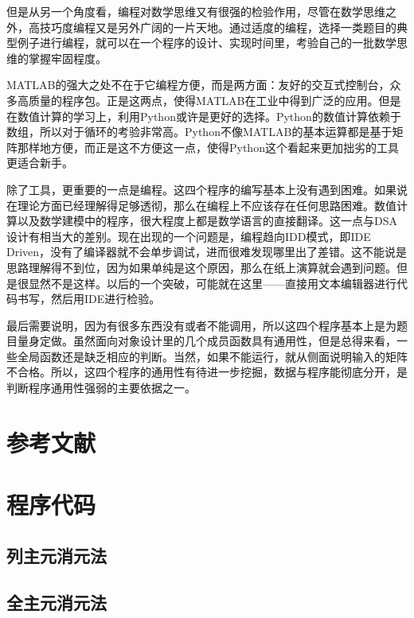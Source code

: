 但是从另一个角度看，编程对数学思维又有很强的检验作用，尽管在数学思维之外，高技巧度编程又是另外广阔的一片天地。通过适度的编程，选择一类题目的典型例子进行编程，就可以在一个程序的设计、实现时间里，考验自己的一批数学思维的掌握牢固程度。

MATLAB的强大之处不在于它编程方便，而是两方面：友好的交互式控制台，众多高质量的程序包。正是这两点，使得MATLAB在工业中得到广泛的应用。但是在数值计算的学习上，利用Python或许是更好的选择。Python的数值计算依赖于数组，所以对于循环的考验非常高。Python不像MATLAB的基本运算都是基于矩阵那样地方便，而正是这不方便这一点，使得Python这个看起来更加拙劣的工具更适合新手。

除了工具，更重要的一点是编程。这四个程序的编写基本上没有遇到困难。如果说在理论方面已经理解得足够透彻，那么在编程上不应该存在任何思路困难。数值计算以及数学建模中的程序，很大程度上都是数学语言的直接翻译。这一点与DSA设计有相当大的差别。现在出现的一个问题是，编程趋向IDD模式，即IDE Driven，没有了编译器就不会单步调试，进而很难发现哪里出了差错。这不能说是思路理解得不到位，因为如果单纯是这个原因，那么在纸上演算就会遇到问题。但是很显然不是这样。以后的一个突破，可能就在这里——直接用文本编辑器进行代码书写，然后用IDE进行检验。\cite{RN686}

最后需要说明，因为有很多东西没有或者不能调用，所以这四个程序基本上是为题目量身定做。虽然面向对象设计里的几个成员函数具有通用性，但是总得来看，一些全局函数还是缺乏相应的判断。当然，如果不能运行，就从侧面说明输入的矩阵不合格。所以，这四个程序的通用性有待进一步挖掘，数据与程序能彻底分开，是判断程序通用性强弱的主要依据之一。

\section{参考文献}

\printbibliography[heading=none]

\section{程序代码}

\subsection{列主元消元法}


\subsection{全主元消元法}


